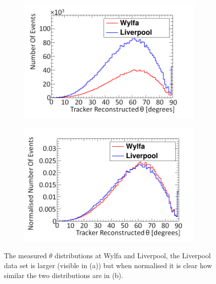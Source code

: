 \begin{figure}[!h]
\centering
\begin{subfigure}{.5\textwidth}
  \centering
  \includegraphics[width=\linewidth]{Chapter6/Figs/Raster/thetaWylfaLiverpoolNewMedText.png}
  \captionsetup{width=.9\linewidth}
  \caption{}
  \label{subFig:measuredThetaWylfaLiv}
\end{subfigure}%
\begin{subfigure}{.5\textwidth}
  \centering
\includegraphics[width=\linewidth]{Chapter6/Figs/Raster/thetaWylfaLiverpoolNewNormMedText.png}
  \captionsetup{width=.9\linewidth}
  \caption{}
  \label{subFig:measuredThetaWylfaLivNorm}
\end{subfigure}
\caption{The measured $\theta$ distributions at Wylfa and Liverpool, the Liverpool data set is larger (visible in (a)) but when normalised it is clear how similar the two distributions are in (b).}
\label{fig:measuredThetaWylfaLiverpool}
\end{figure}

